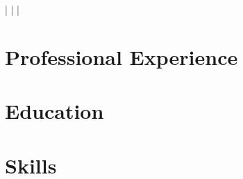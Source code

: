 \documentclass[a4paper,11pt]{article}
\begin{document}
    \begin{center}
        \myName
        \myAddress
        \myWebsite | \myMailAddress | \myGithub | \myPhoneNumber 
    \end{center}

    \section{Professional Experience}
        \begin{itemize}
            \postdocShort
                \cvItemizeBegin
                    \postdocOne
                    \postdocTwo
                \cvItemizeEnd
            \expFlowers
                \cvItemizeBegin
                    \expFlowersOne
                    \expFlowersTwo
                \cvItemizeEnd
            \expInfineon
                \cvItemizeBegin
                    \expInfineonOne
                    \expInfineonTwo
                \cvItemizeEnd
            \expBmw
                \cvItemizeBegin
                    \expBmwOne
                    \expBmwTwo
                \cvItemizeEnd
            \expEgnition
                \expEgnitionDriverless
                \expEgnitionBusinessPlan    
                \expEgnitionTeamLeader
                \expEgnitionAerodynamics
            \expSlive
            \cvItemizeBegin
                \expSliveOne
                \expSliveTwo
            \cvItemizeEnd
        \end{itemize}

    \section{Education}
        \begin{itemize}
            \summerSchool
            \phd
            \msc
            \erasmus
            \bsc
        \end{itemize}

    \section{Skills}
        \begin{itemize}
            \skillsProgramming
            \skillsLanguages
            \skillsInterests
        \end{itemize}
\end{document}
